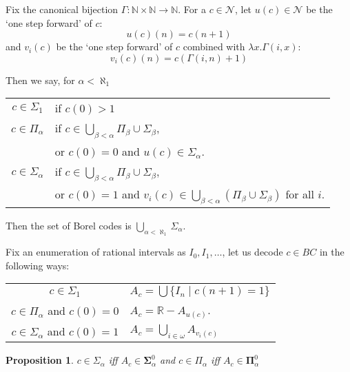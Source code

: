 \documentclass{article}
\newtheorem{proposition}{Proposition}
\begin{document}
Fix the canonical bijection $\Gamma:\mathbb{N}\times \mathbb{N}\to \mathbb{N}$. For a $c\in \mathcal{N}$, let $u(c)\in \mathcal{N}$ be the `one step forward' of $c$: $$ u(c)(n) = c(n+1)$$ and $v_i(c)$ be the `one step forward' of $c$ combined with $\lambda x.\Gamma(i,x)$: $$v_i(c)(n) = c(\Gamma(i,n)+1)$$

Then we say, for $\alpha<\aleph_1$ 

\begin{center}


\begin{tabular}{c l}
    $c\in \Sigma_1$ & if $c(0)>1$ \\
    $c\in \Pi_\alpha$ & if $c\in \bigcup_{\beta<\alpha}\Pi_\beta\cup \Sigma_\beta$, \\
    & or $c(0) = 0$ and $u(c)\in \Sigma_\alpha$. \\
    $c\in \Sigma_\alpha$ & if $c\in \bigcup_{\beta<\alpha}\Pi_\beta\cup \Sigma_\beta$, \\
    & or $c(0) = 1$ and $v_i(c)\in \bigcup_{\beta<\alpha}(\Pi_\beta\cup \Sigma_\beta)$ for all $i$. 
\end{tabular}
    
\end{center}

    

Then the set of Borel codes is $\bigcup_{\alpha<\aleph_1}\Sigma_\alpha$. 

Fix an enumeration of rational intervals as $I_0,I_1,\dots$, let us decode $c\in BC$ in the following ways:

\begin{center}


\begin{tabular}{c l}
    $c\in \Sigma_1$ & $A_c = \bigcup\{I_n\mid c(n+1) = 1\}$  \\
    $c\in \Pi_\alpha$ and $c(0) = 0$ &  $A_c = \mathbb{R} - A_{u(c)}$. \\
    $c\in \Sigma_\alpha$ and $c(0) = 1$ & $A_c = \bigcup_{i\in \omega}A_{v_i(c)}$
\end{tabular}
    
\end{center}

\begin{proposition}
    $c\in \Sigma_\alpha$ iff $A_c\in \boldsymbol{\Sigma}_\alpha^0$ and $c\in \Pi_\alpha$ iff $A_c\in \boldsymbol{\Pi}_\alpha^0$
\end{proposition}
\end{document}
